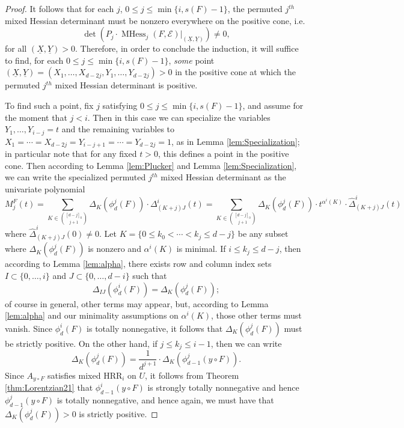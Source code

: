 \documentclass[unnumsec,webpdf,modern,medium]{oup-authoring-template}
\theoremstyle{theorem}
\theoremstyle{definition}
\begin{document}
\begin{proof}
	It follows that for each $j$, $0\leq j\leq \min\{i,s(F)-1\}$, the permuted $j^{th}$ mixed Hessian determinant must be nonzero everywhere on the positive cone, i.e.
	$$\det\left(P_j\cdot \operatorname{MHess}_j(F,\mathcal{E})|_{(\underline{X},\underline{Y})}\right)\neq 0,$$
	for all $\left(\underline{X},\underline{Y}\right)>0$.
	Therefore, in order to conclude the induction, it will suffice to find, for each $0\leq j\leq \min\{i,s(F)-1\}$, \emph{some} point $\left(\underline{X},\underline{Y}\right)=\left(X_1,\ldots,X_{d-2j},Y_1,\ldots,Y_{d-2j}\right)>0$
	in the positive cone at which the permuted $j^{th}$ mixed Hessian determinant is positive.
	
	To find such a point, fix $j$ satisfying $0\leq j\leq \min\{i,s(F)-1\}$, and assume for the moment that $j<i$.  Then in this case we can specialize the variables $Y_1,\ldots,Y_{i-j}=t$ and the remaining variables to $X_1=\cdots=X_{d-2j}=Y_{i-j+1}=\cdots=Y_{d-2j}=1$, as in Lemma \ref{lem:Specialization}; in particular note that for any fixed $t>0$, this defines a point in the positive cone.  Then according to Lemma \ref{lem:Plucker} and Lemma \ref{lem:Specialization}, we can write the specialized permuted $j^{th}$ mixed Hessian determinant as the univariate polynomial
	$$M_j^F(t)=\sum_{K\in\binom{[d-j]_0}{j+1}}\Delta_K\left(\phi^j_d(F)\right)\cdot \Delta^i_{(K+j)J}(t)=\sum_{K\in\binom{[d-j]_0}{j+1}}\Delta_K\left(\phi^j_d(F)\right)\cdot t^{\alpha^i(K)}\cdot \hat{\Delta}^i_{(K+j)J}(t)$$
	where $\hat{\Delta}^i_{(K+j)J}(0)\neq 0$.
	Let $K=\{0\leq k_0<\cdots<k_j\leq d-j\}$ be any subset where $\Delta_K(\phi^j_d(F))$ is nonzero and $\alpha^i(K)$ is minimal.  If $i\leq k_j\leq d-j$, then according to Lemma \ref{lem:alpha}, there exists row and column index sets $I\subset\{0,\ldots,i\}$ and $J\subset\{0,\ldots,d-i\}$ such that  
	$$\Delta_{IJ}\left(\phi^i_d(F)\right)=\Delta_K\left(\phi^j_d(F)\right);$$
	of course in general, other terms may appear, but, according to Lemma \ref{lem:alpha} and our minimality assumptions on $\alpha^i(K)$, those other terms must vanish.
	Since $\phi^i_d(F)$ is totally nonnegative, it follows that $\Delta_K(\phi^j_d(F))$ must be strictly positive.  On the other hand, if $j\leq k_j\leq i-1$, then we can write
	$$\Delta_K(\phi^j_d(F))=\frac{1}{d^{j+1}}\cdot\Delta_K\left(\phi^j_{d-1}\left(y\circ F\right)\right).$$
	Since $A_{y\circ F}$ satisfies mixed HRR$_i$ on $U$, it follows from Theorem \ref{thm:Lorentzian21} that $\phi^i_{d-1}(y\circ F)$ is strongly totally nonnegative and hence $\phi^j_{d-1}\left(y\circ F\right)$ is totally nonnegative, and hence again, we must have that $\Delta_K\left(\phi^j_d(F)\right)>0$ is strictly positive.

\end{proof}
\end{document}
